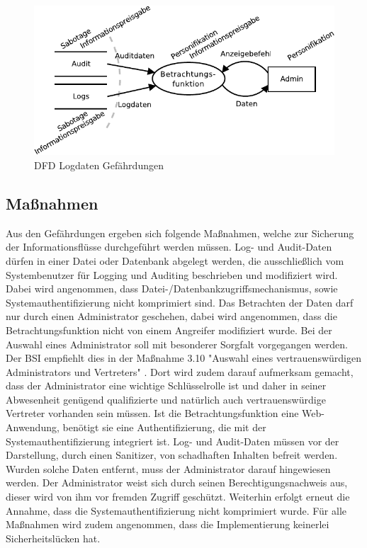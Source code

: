 \documentclass[11pt,a4paper]{report}
\begin{document}
\begin{figure}[htbp]
\centering
\includegraphics[scale=1.2]{images/dfd_logs_threats.pdf}
\caption{DFD Logdaten Gefährdungen}
\label{fig:dfd_logs_threat}
\end{figure}

\subsection{Maßnahmen}

Aus den Gefährdungen ergeben sich folgende Maßnahmen, welche zur Sicherung der Informationsflüsse durchgeführt werden müssen. Log- und Audit-Daten dürfen in einer Datei oder Datenbank abgelegt werden, die ausschließlich vom Systembenutzer für Logging und Auditing beschrieben und modifiziert wird. Dabei wird angenommen, dass Datei-/Datenbankzugriffsmechanismus, sowie Systemauthentifizierung nicht komprimiert sind. Das Betrachten der Daten darf nur durch einen Administrator geschehen, dabei wird angenommen, dass die Betrachtungsfunktion nicht von einem Angreifer modifiziert wurde. Bei der Auswahl eines Administrator soll mit besonderer Sorgfalt vorgegangen werden. Der BSI empfiehlt dies in der Maßnahme 3.10 "Auswahl eines vertrauenswürdigen Administrators und Vertreters" \cite{bsi_m3010}. Dort wird zudem darauf aufmerksam gemacht, dass der Administrator eine wichtige Schlüsselrolle ist und daher in seiner Abwesenheit genügend qualifizierte und natürlich auch vertrauenswürdige Vertreter vorhanden sein müssen. Ist die Betrachtungsfunktion eine Web-Anwendung, benötigt sie eine Authentifizierung, die mit der Systemauthentifizierung integriert ist. Log- und Audit-Daten müssen vor der Darstellung, durch einen Sanitizer, von schadhaften Inhalten befreit werden. Wurden solche Daten entfernt, muss der Administrator darauf hingewiesen werden. Der Administrator weist sich durch seinen Berechtigungsnachweis aus, dieser wird von ihm vor fremden Zugriff geschützt. Weiterhin erfolgt erneut die Annahme, dass die Systemauthentifizierung nicht komprimiert wurde. Für alle Maßnahmen wird zudem angenommen, dass die Implementierung keinerlei Sicherheitslücken hat.
\end{document}
